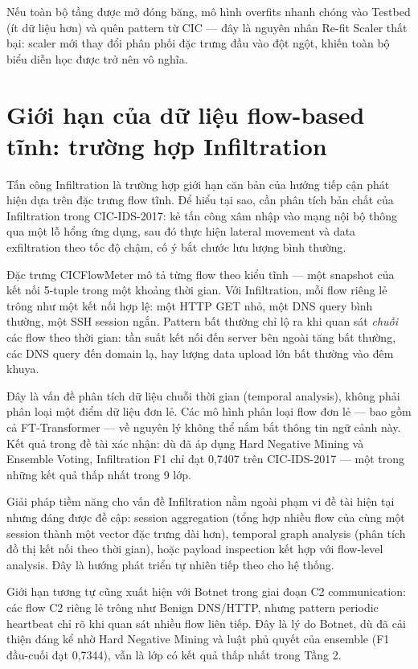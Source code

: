 \documentclass[../DoAn.tex]{subfiles}
\begin{document}
Nếu toàn bộ tầng được mở đóng băng, mô hình overfits nhanh chóng vào Testbed (ít dữ liệu hơn) và quên pattern từ CIC --- đây là nguyên nhân Re-fit Scaler thất bại: scaler mới thay đổi phân phối đặc trưng đầu vào đột ngột, khiến toàn bộ biểu diễn học được trở nên vô nghĩa.

\section{Giới hạn của dữ liệu flow-based tĩnh: trường hợp Infiltration}
\label{sec:pt-infiltration}

Tấn công Infiltration là trường hợp giới hạn căn bản của hướng tiếp cận phát hiện dựa trên đặc trưng flow tĩnh. Để hiểu tại sao, cần phân tích bản chất của Infiltration trong CIC-IDS-2017: kẻ tấn công xâm nhập vào mạng nội bộ thông qua một lỗ hổng ứng dụng, sau đó thực hiện lateral movement và data exfiltration theo tốc độ chậm, cố ý bắt chước lưu lượng bình thường.

Đặc trưng CICFlowMeter mô tả từng flow theo kiểu tĩnh --- một snapshot của kết nối 5-tuple trong một khoảng thời gian. Với Infiltration, mỗi flow riêng lẻ trông như một kết nối hợp lệ: một HTTP GET nhỏ, một DNS query bình thường, một SSH session ngắn. Pattern bất thường chỉ lộ ra khi quan sát \textit{chuỗi} các flow theo thời gian: tần suất kết nối đến server bên ngoài tăng bất thường, các DNS query đến domain lạ, hay lượng data upload lớn bất thường vào đêm khuya.

Đây là vấn đề phân tích dữ liệu chuỗi thời gian (temporal analysis), không phải phân loại một điểm dữ liệu đơn lẻ. Các mô hình phân loại flow đơn lẻ --- bao gồm cả FT-Transformer --- về nguyên lý không thể nắm bắt thông tin ngữ cảnh này. Kết quả trong đề tài xác nhận: dù đã áp dụng Hard Negative Mining và Ensemble Voting, Infiltration F1 chỉ đạt 0,7407 trên CIC-IDS-2017 --- một trong những kết quả thấp nhất trong 9 lớp.

Giải pháp tiềm năng cho vấn đề Infiltration nằm ngoài phạm vi đề tài hiện tại nhưng đáng được đề cập: session aggregation (tổng hợp nhiều flow của cùng một session thành một vector đặc trưng dài hơn), temporal graph analysis (phân tích đồ thị kết nối theo thời gian), hoặc payload inspection kết hợp với flow-level analysis. Đây là hướng phát triển tự nhiên tiếp theo cho hệ thống.

Giới hạn tương tự cũng xuất hiện với Botnet trong giai đoạn C2 communication: các flow C2 riêng lẻ trông như Benign DNS/HTTP, nhưng pattern periodic heartbeat chỉ rõ khi quan sát nhiều flow liên tiếp. Đây là lý do Botnet, dù đã cải thiện đáng kể nhờ Hard Negative Mining và luật phủ quyết của ensemble (F1 đầu-cuối đạt 0,7344), vẫn là lớp có kết quả thấp nhất trong Tầng 2.
\end{document}
